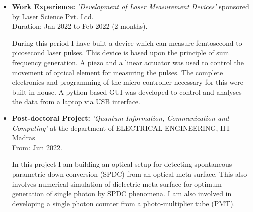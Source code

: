 \documentclass[11pt,a4paper,sans]{moderncv}        %
\begin{document}
\begin{itemize}
\item{\textbf{Work Experience:} \textit{'Development of Laser Measurement Devices'} sponsored by Laser Science Pvt. Ltd.\\ Duration: Jan 2022 to Feb 2022 (2 months).
	
	\vspace{3pt}
	
	\small{During this period I have built a device which can measure femtosecond to picosecond laser pulses. This device is based upon the principle of sum frequency generation. A piezo and a linear actuator was used to control the movement of optical element for measuring the pulses. The complete electronics and programming of the micro-controller necessary for this were built in-house. A python based GUI was developed to control and analyses the data from a laptop via USB interface.}}

\vspace{6pt}

\item{\textbf{Post-doctoral Project:} \textit{'Quantum Information, Communication and Computing'} at the department of ELECTRICAL ENGINEERING, IIT Madras\\ From: Jun 2022.
	
	\vspace{3pt}
	
	\small{In this project I am building an optical setup for detecting spontaneous parametric down conversion (SPDC) from an optical meta-surface. This also involves numerical simulation of dielectric meta-surface for optimum generation of single photon by SPDC phenomena. I am also involved in developing a single photon counter from a photo-multiplier tube (PMT).}}

\end{itemize}
\end{document}
